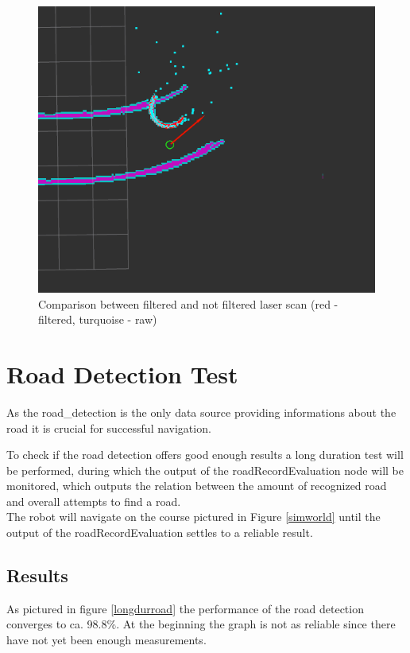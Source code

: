 \begin{figure} [H]
	\includegraphics[width=\textwidth]{Pictures/LASERFILTER COMP}	
	\caption{Comparison between filtered and not filtered laser scan (red - filtered, turquoise - raw)}
	\label{lasercomp}
\end{figure}

\section{Road Detection Test}

As the road\_detection is the only data source providing informations about the road it is crucial for successful navigation.

To check if the road detection offers good enough results a long duration test will be performed, during which the output of the roadRecordEvaluation node will be monitored, which outputs the relation between the amount of recognized road and overall attempts to find a road.\\

The robot will navigate on the course pictured in Figure \ref{simworld} until the output of the roadRecordEvaluation settles to a reliable result.

\subsection{Results}
As pictured in figure \ref{longdurroad} the performance of the road detection converges to ca. 98.8\%. At the beginning the graph is not as reliable since there have not yet been enough measurements.\\

